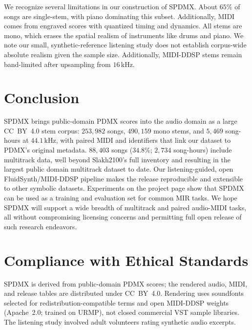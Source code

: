 \documentclass{article}
\begin{document}
We recognize several limitations in our construction of SPDMX.
About $65\%$ of songs are single-stem, with piano dominating this subset.
Additionally, MIDI comes from engraved scores with quantized timing and dynamics.
All stems are mono, which erases the spatial realism of instruments like drums and piano.
We note our small, synthetic-reference listening study does not establish corpus-wide absolute realism given the sample size.
Additionally, MIDI-DDSP stems remain band-limited after upsampling from $16$\,kHz.

\section{Conclusion}
\label{sec:conclusion}

SPDMX brings public-domain PDMX scores into the audio domain as a large CC~BY~4.0 stem corpus: $253{,}982$ songs, $490{,}159$ mono stems, and $5{,}469$ song-hours at $44.1$\,kHz, with paired MIDI and identifiers that link our dataset to PDMX's original metadata.
$88{,}403$ songs ($34.8\%$; $2{,}734$ song-hours) include multitrack data, well beyond Slakh2100's full inventory and resulting in the largest public domain multitrack dataset to date.
Our listening-guided, open FluidSynth/MIDI-DDSP pipeline makes the release reproducible and extensible to other symbolic datasets.
Experiments on the project page show that SPDMX can be used as a training and evaluation set for common MIR tasks.
We hope SPDMX will support a wide breadth of multitrack and paired audio-MIDI tasks, all without compromising licensing concerns and permitting full open release of such research endeavors.

\section{Compliance with Ethical Standards}
\label{sec:ethics}

SPDMX is derived from public-domain PDMX scores; the rendered audio, MIDI, and release tables are distributed under CC~BY~4.0.
Rendering uses soundfonts selected for redistribution-compatible terms and open MIDI-DDSP weights (Apache~2.0; trained on URMP), not closed commercial VST sample libraries.
The listening study involved adult volunteers rating synthetic audio excerpts.


\makeatletter
\let\jazzsamba@thebibliography\thebibliography
\renewcommand{\thebibliography}[1]{%
  \jazzsamba@thebibliography{#1}%
  \setlength{\itemsep}{0pt plus 0.05pt}%
  \setlength{\parsep}{0pt}%
}
\makeatother

\end{document}

